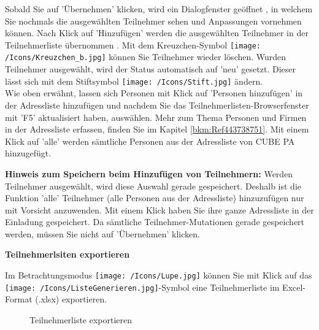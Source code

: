 Sobald Sie auf 'Übernehmen'  klicken, wird ein Dialogfenster geöffnet , in welchem Sie nochmals die ausgewählten Teilnehmer sehen und Anpassungen vornehmen können. Nach Klick auf 'Hinzufügen' werden die ausgewählten Teilnehmer in der Teilnehmerliste übernommen . Mit dem Kreuzchen-Symbol \texttt{[image: /Icons/Kreuzchen\_b.jpg]}  können Sie Teilnehmer wieder löschen. Wurden Teilnehmer ausgewählt, wird der Status automatisch auf 'neu' gesetzt. Dieser lässt sich mit dem Stiftsymbol \texttt{[image: /Icons/Stift.jpg]} ändern.\\

Wie oben erwähnt, lassen sich Personen mit Klick auf 'Personen hinzufügen'  in der Adressliste hinzufügen und nachdem Sie das Teilnehmerlisten-Browserfenster mit 'F5' aktualisiert haben, auswählen. Mehr zum Thema Personen und Firmen in der Adressliste erfassen, finden Sie im Kapitel \ref{bkm:Ref443738751}.
Mit einem Klick auf 'alle'  werden sämtliche Personen aus der Adressliste von CUBE PA hinzugefügt. 

\vspace{\baselineskip}

\textbf{Hinweis zum Speichern beim Hinzufügen von Teilnehmern:} Werden Teilnehmer ausgewählt, wird diese Auswahl gerade gespeichert. Deshalb ist die Funktion 'alle' Teilnehmer  (alle Personen aus der Adressliste) hinzuzufügen nur mit Vorsicht anzuwenden. Mit einem Klick haben Sie ihre ganze Adressliste in der Einladung gespeichert. Da sämtliche Teilnehmer-Mutationen gerade gespeichert werden, müssen Sie nicht auf 'Übernehmen' klicken.

\vspace{\baselineskip}

\textbf{Teilnehmerlsiten exportieren}

Im Betrachtungsmodus \texttt{[image: /Icons/Lupe.jpg]} können Sie mit Klick auf das \texttt{[image: /Icons/ListeGenerieren.jpg]}-Symbol  eine Teilnehmerliste im Excel-Format (.xlsx) exportieren.

\begin{figure}[H]
\caption{Teilnehmerliste exportieren}
\end{figure}

